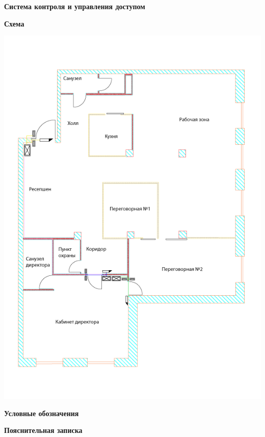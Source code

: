 \documentclass[a4paper,14pt]{extarticle}
\begin{document}
    \vspace{3ex}
    \textbf{\large{Система контроля и управления доступом}}

    \begin{center}
        \textbf{Схема}
    \end{center}
    \vspace{-6ex}
    \begin{center}
        \includegraphics[scale=0.65, angle=90]{pics/SCUD.png}
    \end{center}
    \textbf{Условные обозначения}
    \begin{center}
        
    \end{center}
    \textbf{Пояснительная записка}
\end{document}
